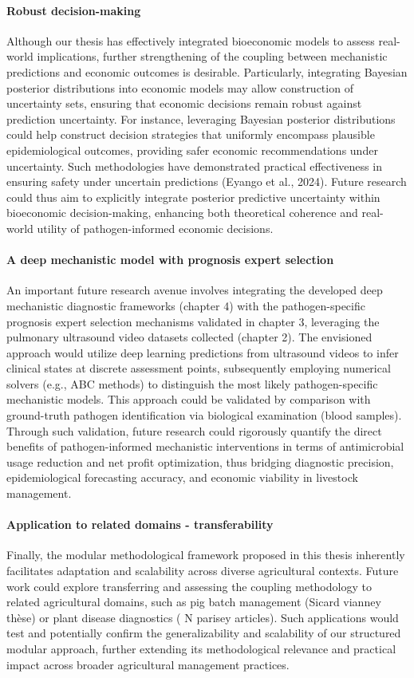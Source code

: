 \paragraph{Robust decision-making} Although our thesis has effectively integrated bioeconomic models to assess real-world implications, further strengthening of the coupling between mechanistic predictions and economic outcomes is desirable. Particularly, integrating Bayesian posterior distributions into economic models may allow construction of uncertainty sets, ensuring that economic decisions remain robust against prediction uncertainty. For instance, leveraging Bayesian posterior distributions could help construct decision strategies that uniformly encompass plausible epidemiological outcomes, providing safer economic recommendations under uncertainty. Such methodologies have demonstrated practical effectiveness in ensuring safety under uncertain predictions (Eyango et al., 2024). Future research could thus aim to explicitly integrate posterior predictive uncertainty within bioeconomic decision-making, enhancing both theoretical coherence and real-world utility of pathogen-informed economic decisions.

\paragraph{A deep mechanistic model with prognosis expert selection} An important future research avenue involves integrating the developed deep mechanistic diagnostic frameworks (chapter 4) with the pathogen-specific prognosis expert selection mechanisms validated in chapter 3, leveraging the pulmonary ultrasound video datasets collected (chapter 2). The envisioned approach would utilize deep learning predictions from ultrasound videos to infer clinical states at discrete assessment points, subsequently employing numerical solvers (e.g., ABC methods) to distinguish the most likely pathogen-specific mechanistic models. This approach could be validated by comparison with ground-truth pathogen identification via biological examination (blood samples). Through such validation, future research could rigorously quantify the direct benefits of pathogen-informed mechanistic interventions in terms of antimicrobial usage reduction and net profit optimization, thus bridging diagnostic precision, epidemiological forecasting accuracy, and economic viability in livestock management. 

\paragraph{Application to related domains - transferability} Finally, the modular methodological framework proposed in this thesis inherently facilitates adaptation and scalability across diverse agricultural contexts. Future work could explore transferring and assessing the coupling methodology to related agricultural domains, such as pig batch management (Sicard vianney thèse) or plant disease diagnostics ( N parisey articles). Such applications would test and potentially confirm the generalizability and scalability of our structured modular approach, further extending its methodological relevance and practical impact across broader agricultural management practices.

